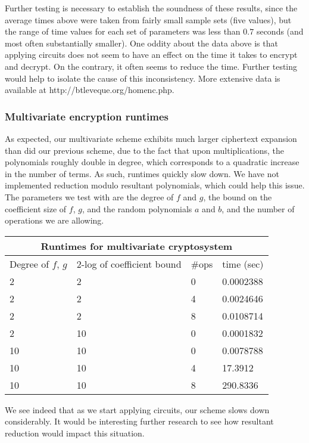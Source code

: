 \documentclass[11pt]{report}
\begin{document}
Further testing is necessary to establish the soundness of these results, since the average times above were taken from fairly small sample sets (five values), but the range of time values for each set of parameters was less than $0.7$ seconds (and most often substantially smaller). One oddity about the data above is that applying circuits does not seem to have an effect on the time it takes to encrypt and decrypt. On the contrary, it often seems to reduce the time. Further testing would help to isolate the cause of this inconsistency. More extensive data is available at http://btleveque.org/homenc.php.

\subsubsection{Multivariate encryption runtimes} As expected, our multivariate scheme exhibits much larger ciphertext expansion than did our previous scheme, due to the fact that upon multiplications, the polynomials roughly double in degree, which corresponds to a quadratic increase in the number of terms. As such, runtimes quickly slow down. We have not implemented reduction modulo resultant polynomials, which could help this issue. The parameters we test with are the degree of $f$ and $g$, the bound on the coefficient size of $f$, $g$, and the random polynomials $a$ and $b$, and the number of operations we are allowing.

\begin{center}
\begin{tabular}{|l|l|l|l|}
\hline
\multicolumn{4}{|c|}{Runtimes for multivariate cryptosystem} \\
\hline
Degree of $f$, $g$ & 2-log of coefficient bound & \#ops & time (sec)\\
\hline
2 & 2 & 0 & 0.0002388 \\
\hline
2 & 2 & 4 & 0.0024646 \\
\hline
2 & 2 & 8 & 0.0108714 \\
\hline
2 & 10 & 0 & 0.0001832 \\
\hline
10 & 10 & 0 & 0.0078788 \\
\hline
10 & 10 & 4 & 17.3912 \\
\hline
10 & 10 & 8 & 290.8336 \\
\hline
\end{tabular}
\end{center}

We see indeed that as we start applying circuits, our scheme slows down considerably. It would be interesting further research to see how resultant reduction would impact this situation.
\end{document}
